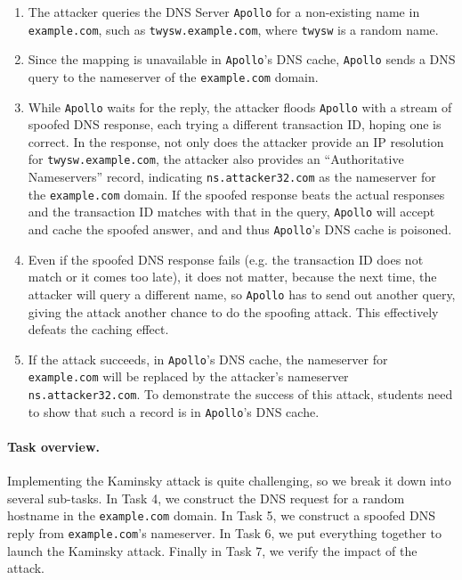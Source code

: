 \begin{enumerate}
\item The attacker queries the DNS Server {\tt Apollo} for a non-existing name in 
{\tt example.com}, such as {\tt twysw.example.com},
where {\tt twysw} is a random name. 

\item Since the mapping is unavailable in {\tt Apollo}'s DNS cache, 
{\tt Apollo} sends a DNS query to the nameserver of
the {\tt example.com} domain.

\item While {\tt Apollo} waits for the reply, 
the attacker floods {\tt Apollo} with a stream of spoofed DNS response,
each trying a different transaction ID, hoping one is correct.
In the response, not only does the attacker provide an IP resolution
for {\tt twysw.example.com}, the attacker 
also provides an ``Authoritative Nameservers'' record, indicating 
{\tt ns.attacker32.com} as the nameserver for the {\tt example.com} domain.
If the spoofed response beats the actual responses and
the transaction ID matches with that in the query, 
{\tt Apollo} will accept and cache the spoofed answer, and
and thus {\tt Apollo}'s DNS cache is poisoned.  

\item Even if the spoofed DNS response fails (e.g.
the transaction ID does not match or it comes too late),
it does not matter, because the next time, the attacker will query
a different name, so {\tt Apollo} has to send out another query, 
giving the attack another chance to do the spoofing attack. 
This effectively defeats the caching effect.


\item If the attack succeeds, in {\tt Apollo}'s DNS cache, the
nameserver for {\tt example.com} will be replaced by the attacker's
nameserver {\tt ns.attacker32.com}.
To demonstrate the success of this attack, students need to show that such a record 
is in {\tt Apollo}'s DNS cache. 

\end{enumerate}


\paragraph{Task overview.} Implementing the Kaminsky attack is quite challenging, 
so we break it down into several sub-tasks. 
In Task 4, we construct the DNS request for a random hostname 
in the \texttt{example.com} domain. In Task 5, we construct a spoofed 
DNS reply from \texttt{example.com}'s nameserver.
In Task 6, we put everything together to launch the 
Kaminsky attack. Finally in Task 7, we verify the impact of the attack. 


